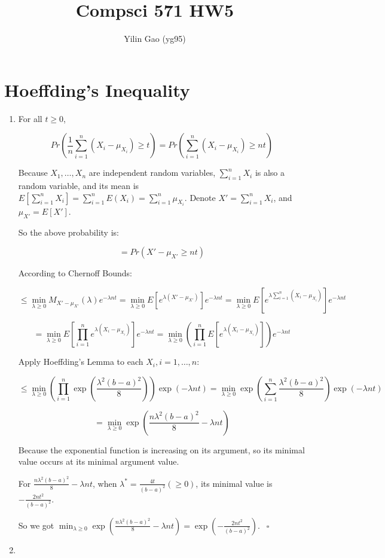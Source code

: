 \documentclass[paper=letter, fontsize=12pt]{article}
\title{Compsci 571 HW5}
\author{Yilin Gao (yg95)}
\begin{document}
\maketitle
\section{Hoeffding's Inequality}

\begin{enumerate}[label=(\alph*)]
	\item 
	For all $t \geq 0$,
	
	$$Pr(\frac{1}{n}\sum_{i=1}^{n}(X_i-\mu_{X_i})\geq t) = Pr(\sum_{i =1}^{n} (X_i - \mu_{X_i}) \geq nt)$$
	
	Because $X_1, \dots, X_n$ are independent random variables, $\sum_{i = 1}^{n} X_i$ is also a random variable, and its mean is $E[\sum_{i = 1}^{n} X_i] = \sum_{i = 1}^{n} E(X_i) = \sum_{i = 1}^{n} \mu_{X_i}$. Denote $X' = \sum_{i = 1}^{n} X_i$, and $\mu_{X'} = E[X']$.
	
	So the above probability is:
	
	$$ = Pr(X' - \mu_{X'} \geq nt)$$

	According to Chernoff Bounds:
	
	$$\leq \min_{\lambda \geq 0} M_{X' - \mu_{X'}} (\lambda) e^{-\lambda nt} = \min_{\lambda \geq 0} E[e^{\lambda (X' - \mu_{X'})}] e^{-\lambda nt} = \min_{\lambda \geq 0} E[e^{\lambda \sum_{i = 1}^{n}(X_i - \mu_{X_i})}] e^{-\lambda nt}$$	
	
	$$= \min_{\lambda \geq 0} E[\prod_{i = 1}^{n} e^{\lambda (X_i - \mu_{X_i})}] e^{-\lambda nt} = \min_{\lambda \geq 0} (\prod_{i = 1}^{n} E[e^{\lambda (X_i - \mu_{X_i})}]) e^{-\lambda nt}$$
	
	Apply Hoeffding's Lemma to each $X_i, i = 1, \dots, n$:
	
	$$\leq \min_{\lambda \geq 0} ( \prod_{i = 1}^{n} \exp(\frac{\lambda^2 (b-a)^2}{8})) \exp(-\lambda nt) = \min_{\lambda \geq 0} \exp(\sum_{i = 1}^{n} \frac{\lambda^2(b-a)^2}{8}) \exp(-\lambda nt)$$
	
	$$= \min_{\lambda \geq 0} \exp(\frac{n \lambda^2 (b-a)^2}{8} - \lambda nt)$$
	
	Because the exponential function is increasing on its argument, so its minimal value occurs at its minimal argument value.
	
	For $\frac{n \lambda^2 (b-a)^2}{8} - \lambda nt$, when $\lambda^* = \frac{4t}{(b-a)^2} (\geq 0)$, its minimal value is $- \frac{2nt^2}{(b-a)^2}$.
	
	So we got $\min_{\lambda \geq 0} \exp(\frac{n \lambda^2 (b-a)^2}{8} - \lambda nt) = \exp(- \frac{2nt^2}{(b-a)^2})$. $\ \ \square$
	
	\item
\end{enumerate}
\end{document}

